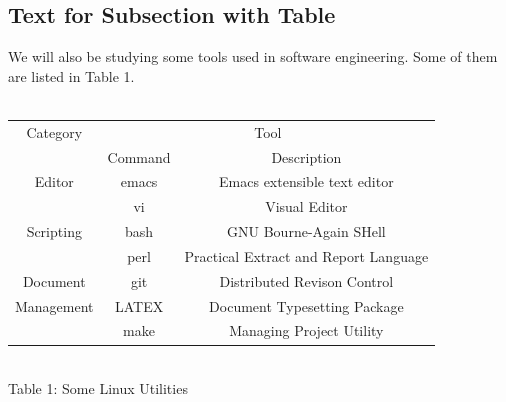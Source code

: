 \documentclass{article}
\begin{document}
\subsection{Text for Subsection with Table}
We will also be studying some tools used in software engineering. Some of
them are listed in Table 1.
\\ \\
\begin{center}
\begin{tabular}{ |c|c|c| } 
\hline
Category & \multicolumn{2}{|c|}{Tool} \\ \cline{2-3}
 & Command & Description \\ \cline{1-3}
 Editor & emacs & Emacs extensible text editor \\
 & vi & Visual Editor \\ \cline{1-3}
 Scripting & bash & GNU Bourne-Again SHell \\ 
 & perl & Practical Extract and Report Language \\ \cline{1-3}
 Document & git & Distributed Revison Control \\
 Management & LATEX & Document Typesetting Package \\
 & make & Managing Project Utility \\
\hline
\end{tabular}
\\ 
\caption{Table 1: Some Linux Utilities}
\end{center}
\end{document}
